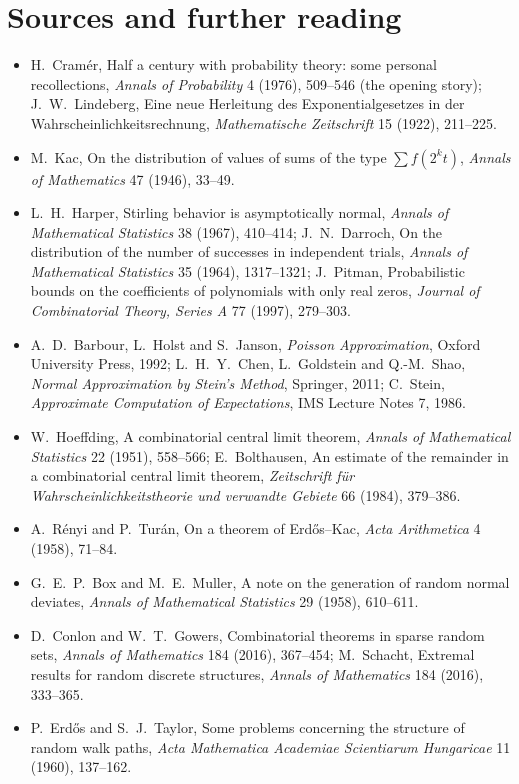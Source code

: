 \section*{Sources and further reading}

\begin{itemize}
\item H.~Cramér, Half a century with probability theory: some personal recollections, \emph{Annals of Probability} 4 (1976), 509--546 (the opening story);
J.~W.~Lindeberg, Eine neue Herleitung des Exponentialgesetzes in der Wahrscheinlichkeitsrechnung, \emph{Mathematische Zeitschrift} 15 (1922), 211--225.
\item M.~Kac, On the distribution of values of sums of the type $\sum f(2^kt)$, \emph{Annals of Mathematics} 47 (1946), 33--49.
\item L.~H.~Harper, Stirling behavior is asymptotically normal, \emph{Annals of Mathematical Statistics} 38 (1967), 410--414; J.~N.~Darroch, On the distribution of the number of
successes in independent trials, \emph{Annals of Mathematical Statistics} 35 (1964), 1317--1321; J.~Pitman, Probabilistic bounds on the coefficients of polynomials with only real
zeros, \emph{Journal of Combinatorial Theory, Series A} 77 (1997), 279--303.
\item A.~D.~Barbour, L.~Holst and S.~Janson, \emph{Poisson Approximation}, Oxford University Press, 1992; L.~H.~Y.~Chen, L.~Goldstein and Q.-M.~Shao, \emph{Normal Approximation by
Stein's Method}, Springer, 2011; C.~Stein, \emph{Approximate Computation of Expectations}, IMS Lecture Notes 7, 1986.
\item W.~Hoeffding, A combinatorial central limit theorem, \emph{Annals of Mathematical Statistics} 22 (1951), 558--566; E.~Bolthausen, An estimate of the remainder in a combinatorial
central limit theorem, \emph{Zeitschrift für Wahrscheinlichkeitstheorie und verwandte Gebiete} 66 (1984), 379--386.
\item A.~Rényi and P.~Turán, On a theorem of Erdős--Kac, \emph{Acta Arithmetica} 4 (1958), 71--84.
\item G.~E.~P.~Box and M.~E.~Muller, A note on the generation of random normal deviates, \emph{Annals of Mathematical Statistics} 29 (1958), 610--611.
\item D.~Conlon and W.~T.~Gowers, Combinatorial theorems in sparse random sets, \emph{Annals of Mathematics} 184 (2016), 367--454; M.~Schacht, Extremal results for random discrete
structures, \emph{Annals of Mathematics} 184 (2016), 333--365.
\item P.~Erdős and S.~J.~Taylor, Some problems concerning the structure of random walk paths, \emph{Acta Mathematica Academiae Scientiarum Hungaricae} 11 (1960), 137--162.

\end{itemize}
